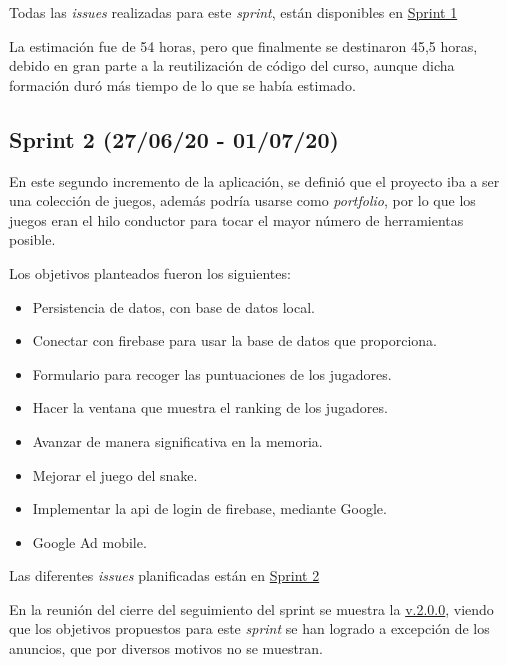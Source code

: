 Todas las \emph{issues} realizadas para este \emph{sprint}, están disponibles en \href{https://github.com/scc0034/flutter_serpiente/milestone/1?closed=1}{Sprint 1}

La estimación fue de 54 horas, pero que finalmente se destinaron 45,5 horas, debido en gran parte a la reutilización de código del curso, aunque dicha formación duró más tiempo de lo que se había estimado.


\subsection{Sprint 2 (27/06/20 - 01/07/20)}\label{sprint-1-270620---010720}
En este segundo incremento de la aplicación, se definió que el proyecto iba a ser una colección de juegos, además podría usarse como \emph{portfolio}, por lo que los juegos eran el hilo conductor para tocar el mayor número de herramientas posible. 

Los objetivos planteados fueron los siguientes:
\begin{itemize}
	\item Persistencia de datos, con base de datos local.
	\item Conectar con firebase para usar la base de datos que proporciona.
	\item Formulario para recoger las puntuaciones de los jugadores.
	\item Hacer la ventana que muestra el ranking de los jugadores.
	\item Avanzar de manera significativa en la memoria.
	\item Mejorar el juego del snake.
	\item Implementar la api de login de firebase, mediante Google.
	\item Google Ad mobile.
\end{itemize}

Las diferentes \emph{issues} planificadas están en \href{https://github.com/scc0034/flutter_serpiente/milestone/2?closed=1}{Sprint 2}


En la reunión del cierre del seguimiento del sprint se muestra la \href{https://github.com/scc0034/flutter_serpiente/releases/tag/V.2.0.0/}{v.2.0.0}, viendo que los objetivos propuestos para este \emph{sprint} se han logrado a excepción de los anuncios, que por diversos motivos no se muestran.
 	

